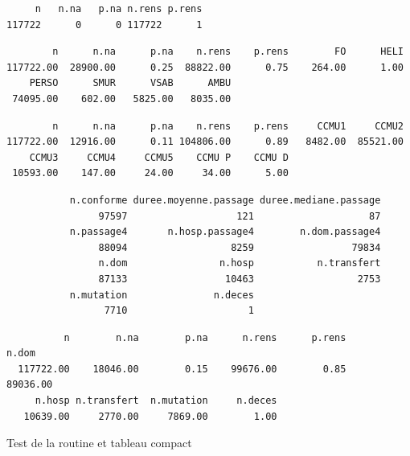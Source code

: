 \documentclass[]{article}
\begin{document}
\begin{verbatim}
     n   n.na   p.na n.rens p.rens 
117722      0      0 117722      1 
\end{verbatim}

\begin{verbatim}
        n      n.na      p.na    n.rens    p.rens        FO      HELI 
117722.00  28900.00      0.25  88822.00      0.75    264.00      1.00 
    PERSO      SMUR      VSAB      AMBU 
 74095.00    602.00   5825.00   8035.00 
\end{verbatim}

\begin{verbatim}
        n      n.na      p.na    n.rens    p.rens     CCMU1     CCMU2 
117722.00  12916.00      0.11 104806.00      0.89   8482.00  85521.00 
    CCMU3     CCMU4     CCMU5    CCMU P    CCMU D 
 10593.00    147.00     24.00     34.00      5.00 
\end{verbatim}

\begin{verbatim}
           n.conforme duree.moyenne.passage duree.mediane.passage 
                97597                   121                    87 
           n.passage4       n.hosp.passage4        n.dom.passage4 
                88094                  8259                 79834 
                n.dom                n.hosp           n.transfert 
                87133                 10463                  2753 
           n.mutation               n.deces 
                 7710                     1 
\end{verbatim}

\begin{verbatim}
          n        n.na        p.na      n.rens      p.rens       n.dom 
  117722.00    18046.00        0.15    99676.00        0.85    89036.00 
     n.hosp n.transfert  n.mutation     n.deces 
   10639.00     2770.00     7869.00        1.00 
\end{verbatim}

Test de la routine et tableau compact
\end{document}
